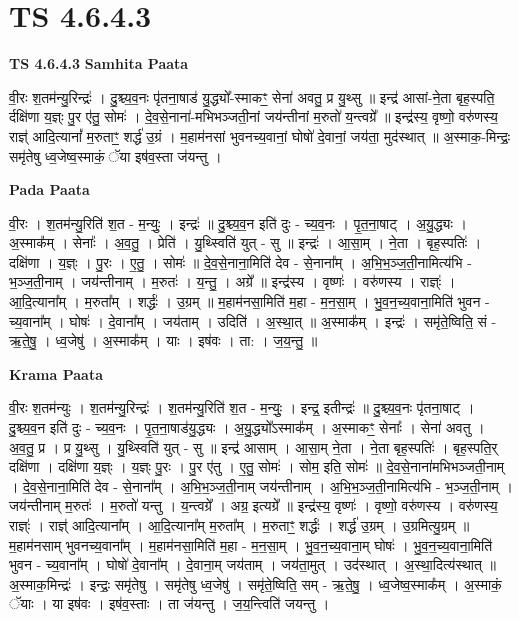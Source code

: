 \documentclass[17pt]{extarticle}
\begin{document}
\section{ TS 4.6.4.3 }

\textbf{TS 4.6.4.3 } \newline
\textbf{Samhita Paata} \newline

वी॒रः श॒तम॑न्यु॒रिन्द्रः॑ । दु॒श्च्य॒व॒नः पृ॑तना॒षाड॑ यु॒द्ध्यो᳚-स्माकꣳ॒॒ सेना॑ अवतु॒ प्र यु॒थ्सु ॥ इन्द्र॑ आसां-ने॒ता बृह॒स्पति॒ र्दक्षि॑णा य॒ज्ञ्ः पु॒र ए॑तु॒ सोमः॑ । दे॒व॒से॒नाना॑-मभिभञ्जती॒नां जय॑न्तीनां म॒रुतो॑ य॒न्त्वग्रे᳚ ॥ इन्द्र॑स्य॒ वृष्णो॒ वरु॑णस्य॒ राज्ञ्॑ आदि॒त्यानां᳚ म॒रुताꣳ॒॒ शर्द्ध॑ उ॒ग्रं । म॒हाम॑नसां भुवनच्य॒वानां॒ घोषो॑ दे॒वानां॒ जय॑ता॒ मुद॑स्थात् ॥ अ॒स्माक॒-मिन्द्रः॒ समृ॑तेषु ध्व॒जेष्व॒स्माकं॒ ॅया इष॑व॒स्ता ज॑यन्तु । \newline

\textbf{Pada Paata} \newline

वी॒रः । श॒तम॑न्यु॒रिति॑ श॒त - म॒न्युः॒ । इन्द्रः॑ ॥ दु॒श्च्य॒व॒न इति॑ दुः - च्य॒व॒नः । पृ॒त॒ना॒षाट् । अ॒यु॒द्ध्यः । अ॒स्माक᳚म् । सेनाः᳚ । अ॒व॒तु॒ । प्रेति॑ । यु॒थ्स्विति॑ युत् - सु ॥ इन्द्रः॑ । आ॒सा॒म् । ने॒ता । बृह॒स्पतिः॑ । दक्षि॑णा । य॒ज्ञ्ः । पु॒रः । ए॒तु॒ । सोमः॑ ॥ दे॒व॒से॒नाना॒मिति॑ देव - से॒नाना᳚म् । अ॒भि॒भ॒ञ्ज॒ती॒नामित्य॑भि - भ॒ञ्ज॒ती॒नाम् । जय॑न्तीनाम् । म॒रुतः॑ । य॒न्तु॒ । अग्रे᳚ ॥ इन्द्र॑स्य । वृष्णः॑ । वरु॑णस्य । राज्ञ्ः॑ । आ॒दि॒त्याना᳚म् । म॒रुता᳚म् । शर्द्धः॑ । उ॒ग्रम् ॥ म॒हाम॑नसा॒मिति॑ म॒हा - म॒न॒सा॒म् । भु॒व॒न॒च्य॒वाना॒मिति॑ भुवन - च्य॒वाना᳚म् । घोषः॑ । दे॒वाना᳚म् । जय॑ताम् । उदिति॑ । अ॒स्था॒त् ॥ अ॒स्माक᳚म् । इन्द्रः॑ । समृ॑ते॒ष्विति॒ सं - ऋ॒ते॒षु॒ । ध्व॒जेषु॑ । अ॒स्माक᳚म् । याः । इष॑वः । ता: । ज॒य॒न्तु॒ ॥  \newline


\textbf{Krama Paata} \newline

वी॒रः श॒तम॑न्युः । श॒तम॑न्यु॒रिन्द्रः॑ । श॒तम॑न्यु॒रिति॑ श॒त - म॒न्युः॒ । इन्द्र॒ इतीन्द्रः॑ ॥ दु॒श्च्य॒व॒नः पृ॑तना॒षाट् । दु॒श्च्य॒व॒न इति॑ दुः - च्य॒व॒नः । पृ॒त॒ना॒षाड॑यु॒द्ध्यः । अ॒यु॒द्ध्यो᳚ऽस्माक᳚म् । अ॒स्माकꣳ॒॒ सेनाः᳚ । सेना॑ अवतु । अ॒व॒तु॒ प्र । प्र यु॒थ्सु । यु॒थ्स्विति॑ युत् - सु ॥ इन्द्र॑ आसाम् । आ॒सा॒म् ने॒ता । ने॒ता बृह॒स्पतिः॑ । बृह॒स्पति॒र् दक्षि॑णा । दक्षि॑णा य॒ज्ञ्ः । य॒ज्ञ्ः पु॒रः । पु॒र ए॑तु । ए॒तु॒ सोमः॑ । सोम॒ इति॒ सोमः॑ ॥ दे॒व॒से॒नाना॑मभिभञ्जती॒नाम् । दे॒व॒से॒नाना॒मिति॑ देव - से॒नाना᳚म् । अ॒भि॒भ॒ञ्ज॒ती॒नाम् जय॑न्तीनाम् । अ॒भि॒भ॒ञ्ज॒ती॒नामित्य॑भि - भ॒ञ्ज॒ती॒नाम् । जय॑न्तीनाम् म॒रुतः॑ । म॒रुतो॑ यन्तु । य॒न्त्वग्रे᳚ । अग्र॒ इत्यग्रे᳚ ॥ इन्द्र॑स्य॒ वृष्णः॑ । वृष्णो॒ वरु॑णस्य । वरु॑णस्य॒ राज्ञ्ः॑ । राज्ञ्॑ आदि॒त्याना᳚म् । आ॒दि॒त्याना᳚म् म॒रुता᳚म् । म॒रुताꣳ॒॒ शर्द्धः॑ । शर्द्ध॑ उ॒ग्रम् । उ॒ग्रमित्यु॒ग्रम् ॥ म॒हाम॑नसाम् भुवनच्य॒वाना᳚म् । म॒हाम॑नसा॒मिति॑ म॒हा - म॒न॒सा॒म् । भु॒व॒न॒च्य॒वाना॒म् घोषः॑ । भु॒व॒न॒च्य॒वाना॒मिति॑ भुवन - च्य॒वाना᳚म् । घोषो॑ दे॒वाना᳚म् । दे॒वाना॒म् जय॑ताम् । जय॑ता॒मुत् । उद॑स्थात् । अ॒स्था॒दित्य॑स्थात् ॥ अ॒स्माक॒मिन्द्रः॑ । इन्द्रः॒ समृ॑तेषु । समृ॑तेषु ध्व॒जेषु॑ । समृ॑ते॒ष्विति॒ सम् - ऋ॒ते॒षु॒ । ध्व॒जेष्व॒स्माक᳚म् । अ॒स्माकं॒ ॅयाः । या इष॑वः । इष॑व॒स्ताः । ता ज॑यन्तु । ज॒य॒न्त्विति॑ जयन्तु । \newline
\end{document}
